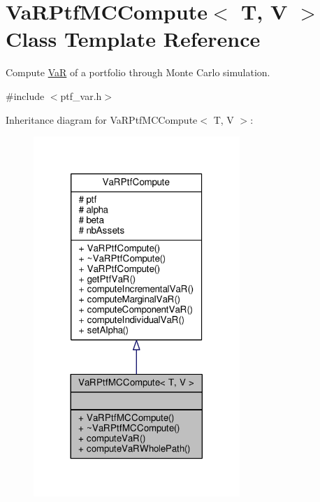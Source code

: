 \hypertarget{classVaRPtfMCCompute}{}\section{Va\+R\+Ptf\+M\+C\+Compute$<$ T, V $>$ Class Template Reference}
\label{classVaRPtfMCCompute}


Compute \hyperlink{classVaR}{VaR} of a portfolio through Monte Carlo simulation.  




{\ttfamily \#include $<$ptf\+\_\+var.\+h$>$}



Inheritance diagram for Va\+R\+Ptf\+M\+C\+Compute$<$ T, V $>$\+:
\nopagebreak
\begin{figure}[H]
\begin{center}
\leavevmode
\includegraphics[width=221pt]{classVaRPtfMCCompute__inherit__graph}
\end{center}
\end{figure}


